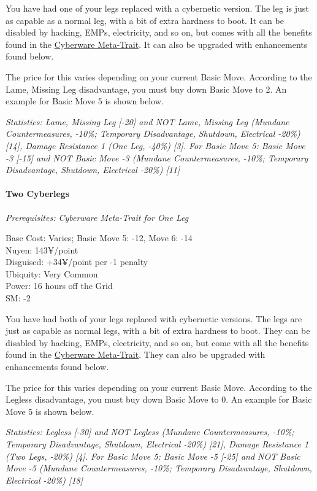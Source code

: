 \begin{multicols*}{3}
	You have had one of your legs replaced with a cybernetic version. The leg is just as capable as a normal leg, with a bit of extra hardness to boot. It can be disabled by hacking, EMPs, electricity, and so on, but comes with all the benefits found in the \hyperref[cyberware-meta-trait]{Cyberware Meta-Trait}. It can also be upgraded with enhancements found below.
	
	The price for this varies depending on your current Basic Move. According to the Lame, Missing Leg disadvantage, you must buy down Basic Move to 2. An example for Basic Move 5 is shown below.	
	
	\textit{\textcolor{OliveGreen}{Statistics:  Lame, Missing Leg [-20] and NOT Lame, Missing Leg (Mundane Countermeasures, -10\%; Temporary Disadvantage, Shutdown, Electrical -20\%) [14], Damage Resistance 1 (One Leg, -40\%) [3]. For Basic Move 5: Basic Move -3 [-15] and NOT Basic Move -3 (Mundane Countermeasures, -10\%; Temporary Disadvantage, Shutdown, Electrical -20\%) [11]}}
	
	\paragraph{Two Cyberlegs}
	\textit{Prerequisites:  Cyberware Meta-Trait for One Leg}
	\begin{flushright}
		Base Cost: Varies; Basic Move 5: -12, Move 6: -14\\
		Nuyen: 143¥/point\\
		Disguised: +34¥/point per -1 penalty\\
		Ubiquity: Very Common\\
		Power: 16 hours off the Grid\\
		SM: -2
	\end{flushright}

	You have had both of your legs replaced with cybernetic versions. The legs are just as capable as normal legs, with a bit of extra hardness to boot. They can be disabled by hacking, EMPs, electricity, and so on, but come with all the benefits found in the \hyperref[cyberware-meta-trait]{Cyberware Meta-Trait}. They can also be upgraded with enhancements found below.
	
	The price for this varies depending on your current Basic Move. According to the Legless disadvantage, you must buy down Basic Move to 0. An example for Basic Move 5 is shown below.
	
	\textit{\textcolor{OliveGreen}{Statistics:  Legless [-30] and NOT Legless (Mundane Countermeasures, -10\%; Temporary Disadvantage, Shutdown, Electrical -20\%) [21], Damage Resistance 1 (Two Legs, -20\%) [4]. For Basic Move 5: Basic Move -5 [-25] and NOT Basic Move -5 (Mundane Countermeasures, -10\%; Temporary Disadvantage, Shutdown, Electrical -20\%) [18]}}
	

\end{multicols*}
